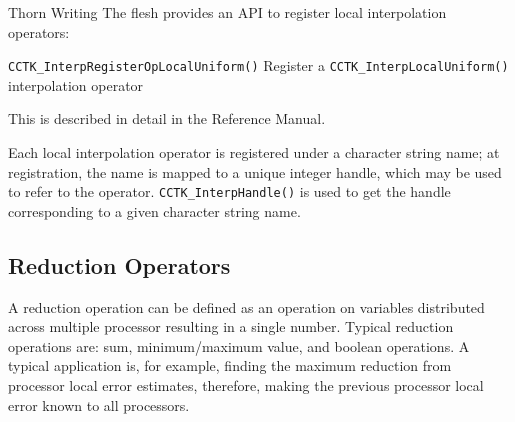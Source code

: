 \begin{cactuspart}{Thorn Writing}
The flesh provides an API to register local interpolation operators:
\begin{Lentry}
\item[\texttt{CCTK\_InterpRegisterOpLocalUniform()}]
        Register a \verb|CCTK_InterpLocalUniform()| interpolation operator
\end{Lentry}
This is described in detail in the Reference Manual.

Each local interpolation operator is registered under a character string name;
at registration, the name is mapped to a unique integer handle, which
may be used to refer to the operator.  \verb|CCTK_InterpHandle()|
is used to get the handle corresponding to a given character string
name.


\subsection{Reduction Operators}
\label{sec:reop}

A reduction operation can be defined as an operation on variables
distributed  across multiple processor resulting in a single number.
Typical reduction operations are: sum, minimum/maximum value, and boolean
operations. A typical application is, for example, 
finding the maximum reduction from processor local error estimates, 
therefore, making the previous processor local error known to all processors. 


\end{cactuspart}
